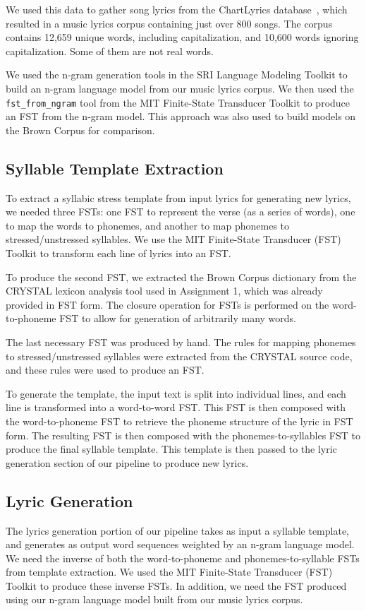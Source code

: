 \documentclass{vgtc}                          %
\begin{document}
We used this data to gather song lyrics from the ChartLyrics database~\cite{chartlyrics},
which resulted in a music lyrics corpus containing just over 800 songs. The corpus
contains 12,659 unique words, including capitalization, and 10,600 words
ignoring capitalization. Some of them are not real words.

We used the n-gram generation tools in the SRI Language Modeling Toolkit to build
an n-gram language model from our music lyrics corpus. We then used the
\texttt{fst\_from\_ngram} tool from
the MIT Finite-State Transducer Toolkit to produce
an FST from the n-gram model. This approach was also used to build
models on the Brown Corpus for comparison.

\subsection{Syllable Template Extraction}
To extract a syllabic stress template from input lyrics for generating
new lyrics, we needed three FSTs: one FST to represent the verse (as a series of words),
one to map the words to phonemes, and
another to map phonemes to stressed/unstressed syllables.
We use the MIT Finite-State Transducer (FST) Toolkit
to transform each line of lyrics into an FST.

To produce the second FST, we extracted
the Brown Corpus dictionary from the CRYSTAL lexicon
analysis tool used in Assignment 1, which was already
provided in FST form. The closure operation for FSTs
is performed on the word-to-phoneme FST to allow for
generation of arbitrarily many words.

The last necessary FST was produced by hand. The rules for mapping
phonemes to stressed/unstressed syllables
were extracted from the CRYSTAL source code, and these
rules were used to produce an FST.

To generate the template, the input text is split into individual lines, and
each line is transformed into a word-to-word FST.
This FST is then composed with the word-to-phoneme FST
to retrieve the phoneme structure of the lyric in FST
form. The resulting FST is then composed with the phonemes-to-syllables
FST to produce the final syllable template. This template is then
passed to the lyric generation section of our pipeline to produce
new lyrics.

\subsection{Lyric Generation}
The lyrics generation portion of our pipeline takes as input
a syllable template, and generates as output word sequences
weighted by an n-gram language model. We need the inverse
of both the word-to-phoneme and phonemes-to-syllable
FSTs from template extraction. We used the MIT Finite-State
Transducer (FST) Toolkit to produce these inverse FSTs.
In addition, we need the FST produced using our n-gram language
model built from our music lyrics corpus.
\end{document}
